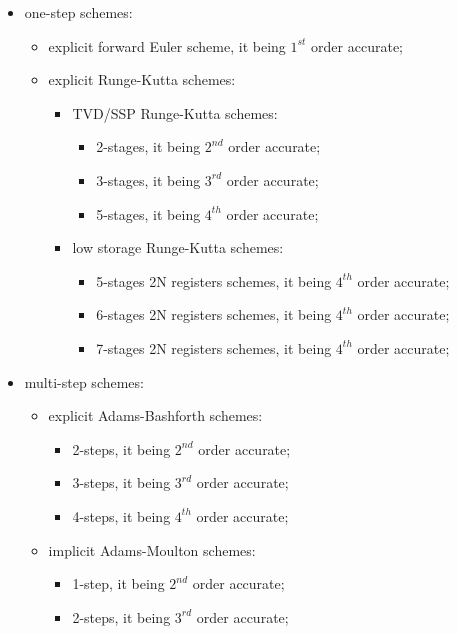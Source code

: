 \documentclass[pdftex,preprint,3p,times,numbers]{elsarticle}
\begin{document}
\begin{itemize}
  \item one-step schemes:
    \begin{itemize}
      \item explicit forward Euler scheme, it being $1^{st}$ order accurate;
      \item explicit Runge-Kutta schemes:
        \begin{itemize}
          \item TVD/SSP Runge-Kutta schemes:
            \begin{itemize}
              \item 2-stages, it being $2^{nd}$ order accurate;
              \item 3-stages, it being $3^{rd}$ order accurate;
              \item 5-stages, it being $4^{th}$ order accurate;
              \end{itemize}
          \item low storage Runge-Kutta schemes:
            \begin{itemize}
              \item 5-stages 2N registers schemes, it being $4^{th}$ order accurate;
              \item 6-stages 2N registers schemes, it being $4^{th}$ order accurate;
              \item 7-stages 2N registers schemes, it being $4^{th}$ order accurate;
              \end{itemize}
          \end{itemize}
      \end{itemize}
  \item multi-step schemes:
    \begin{itemize}
      \item explicit Adams-Bashforth schemes:
        \begin{itemize}
          \item 2-steps, it being $2^{nd}$ order accurate;
          \item 3-steps, it being $3^{rd}$ order accurate;
          \item 4-steps, it being $4^{th}$ order accurate;
          \end{itemize}
      \item implicit Adams-Moulton schemes:
        \begin{itemize}
          \item 1-step, it being $2^{nd}$ order accurate;
          \item 2-steps, it being $3^{rd}$ order accurate;

\end{itemize}
\end{itemize}
\end{itemize}
\end{document}
